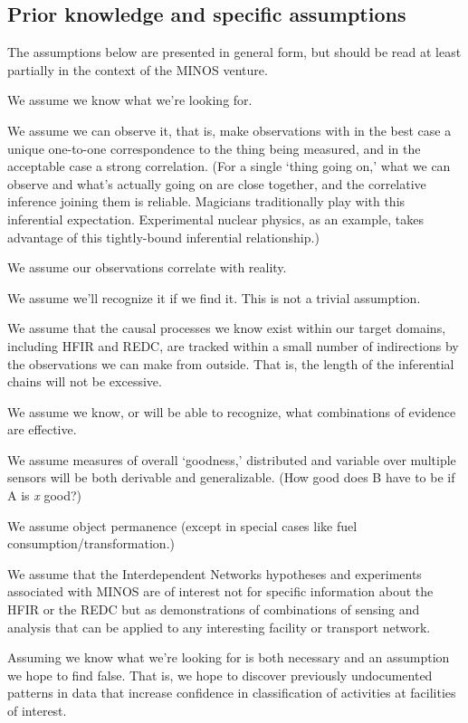 \documentclass{article} %
\begin{document}
\subsection{Prior knowledge and specific assumptions}
The assumptions below are presented in general form, but should be read at least partially in the context of the MINOS venture.
\begin{itemize*}
\item We assume we know what we're looking for. 
\item We assume we can observe it, that is, make observations with in the best case a unique one-to-one correspondence to the thing being measured, and in the acceptable case a strong correlation. (For a single `thing going on,' what we can observe and what's actually going on are close together, and the correlative inference joining them is reliable. Magicians traditionally play with this inferential expectation. Experimental nuclear physics, as an example, takes advantage of this tightly-bound inferential relationship.)
\item We assume our observations correlate with reality. 
\item We assume we'll recognize it if we find it. This is not a trivial assumption.
\item We assume that the causal processes we know exist within our target domains, including HFIR and REDC, are tracked within a small number of indirections by the observations we can make from outside. That is, the length of the inferential chains will not be excessive.
\item We assume we know, or will be able to recognize, what combinations of evidence are effective. 
\item We assume measures of overall `goodness,' distributed and variable over multiple sensors will be both derivable and generalizable. (How good does B have to be if A is \textit{x} good?)
\item We assume object permanence (except in special cases like fuel consumption/transformation.)
\end{itemize*}

We assume that the Interdependent Networks hypotheses and experiments associated with MINOS are of interest not for specific information about the HFIR or the REDC but as demonstrations of combinations of sensing and analysis that can be applied to any interesting facility or transport network.

Assuming we know what we're looking for is both necessary and an assumption we hope to find false. That is, we hope to discover previously undocumented patterns in data that increase confidence in classification of activities at facilities of interest. 
\end{document}

